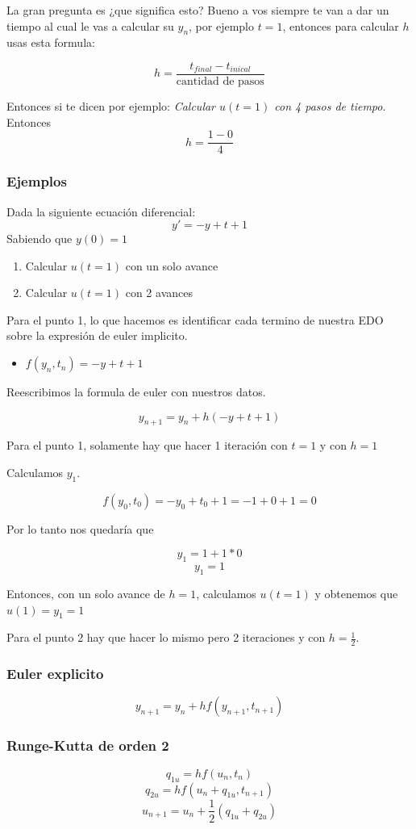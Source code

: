 La gran pregunta es ¿que significa esto? Bueno a vos siempre te van a dar un tiempo al cual le vas a calcular su $y_n$, por ejemplo $t = 1$, entonces para calcular $h$ usas esta formula: 

$$
h = \frac{t_{final} - t_{inical}}{\text{cantidad de pasos}}
$$

Entonces si te dicen por ejemplo: 
\textit{Calcular $u(t=1)$ con 4 pasos de tiempo}. Entonces 
$$
h = \frac{1 - 0}{4}
$$

\subsubsection{Ejemplos}
Dada la siguiente ecuación diferencial: 
$$y' = -y + t +1$$
Sabiendo que $y(0) = 1$

\begin{enumerate}
    \item {Calcular $u(t=1)$ con un solo avance}
    \item {Calcular $u(t=1)$ con 2 avances}
\end{enumerate} 


Para el punto 1, lo que hacemos es identificar cada termino de nuestra EDO sobre la expresión de euler implicito. 

\begin{itemize}
    \item {$f(y_n, t_n) = -y + t + 1$}
\end{itemize}

Reescribimos la formula de euler con nuestros datos. 

$$ 
y_{n+1} = y_n + h  (-y + t + 1)
$$

Para el punto 1, solamente hay que hacer 1 iteración con $t = 1$ y con $h = 1$

Calculamos $y_1$. 

$$
f(y_0, t_0) = -y_0+ t_0 + 1 = -1 + 0 + 1 = 0 
$$

Por lo tanto nos quedaría que

$$y_1 = 1 + 1*0 $$
$$y_1 = 1  $$

Entonces, con un solo avance de $h = 1$, calculamos $u(t = 1)$ y obtenemos que $u(1) = y_1 = 1$

Para el punto 2 hay que hacer lo mismo pero 2 iteraciones y con $h = \frac{1}{2}$.
\subsubsection{Euler explicito}
$$
    y_{n+1} = y_n + h  f(y_{n + 1}, t_{n + 1})
$$
\subsubsection{Runge-Kutta de orden 2 }
$$
    q_{1u} = h  f(u_{n}, t_{n})
$$
$$
    q_{2u} = h  f(u_{n} + q_{1u}, t_{n + 1})
$$
$$
    u_{n+1} = u_n + \frac{1}{2}  (q_{1u} + q_{2u})
$$
